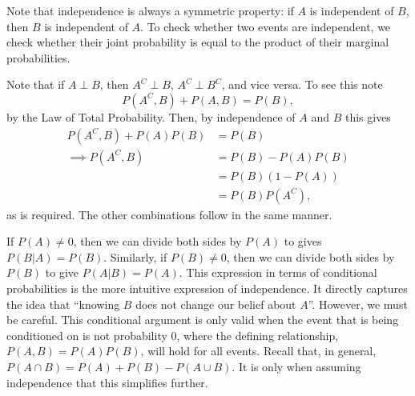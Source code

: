 \documentclass[
  letterpaper,
  DIV=11,
  numbers=noendperiod]{scrreprt}
\theoremstyle{definition}
\theoremstyle{definition}
\theoremstyle{definition}
\theoremstyle{remark}
\begin{document}
Note that independence is always a symmetric property: if \(A\) is
independent of \(B\), then \(B\) is independent of \(A\). To check
whether two events are independent, we check whether their joint
probability is equal to the product of their marginal probabilities.

\begin{tcolorbox}[enhanced jigsaw, coltitle=black, colframe=quarto-callout-warning-color-frame, colbacktitle=quarto-callout-warning-color!10!white, bottomrule=.15mm, opacitybacktitle=0.6, colback=white, toptitle=1mm, arc=.35mm, leftrule=.75mm, bottomtitle=1mm, opacityback=0, breakable, rightrule=.15mm, title={Properties of Independence}, left=2mm, titlerule=0mm, toprule=.15mm]

Note that if \(A\perp B\), then \(A^C\perp B\), \(A^C\perp B^C\), and
vice versa. To see this note \[P(A^C, B) + P(A, B) = P(B),\] by the Law
of Total Probability. Then, by independence of \(A\) and \(B\) this
gives \begin{align*}
P(A^C, B) + P(A)P(B) &= P(B) \\
\implies P(A^C, B) &= P(B) - P(A)P(B) \\
&= P(B)(1 - P(A)) \\
&= P(B)P(A^C),\end{align*} as is required. The other combinations follow
in the same manner.

\end{tcolorbox}

If \(P(A)\neq 0\), then we can divide both sides by \(P(A)\) to gives
\(P(B|A) = P(B)\). Similarly, if \(P(B)\neq 0\), then we can divide both
sides by \(P(B)\) to give \(P(A|B)=P(A)\). This expression in terms of
conditional probabilities is the more intuitive expression of
independence. It directly captures the idea that ``knowing \(B\) does
not change our belief about \(A\)''. However, we must be careful. This
conditional argument is only valid when the event that is being
conditioned on is not probability \(0\), where the defining
relationship, \(P(A,B) = P(A)P(B)\), will hold for all events. Recall
that, in general, \(P(A\cap B) = P(A)+P(B)-P(A\cup B)\). It is only when
assuming independence that this simplifies further.
\end{document}
